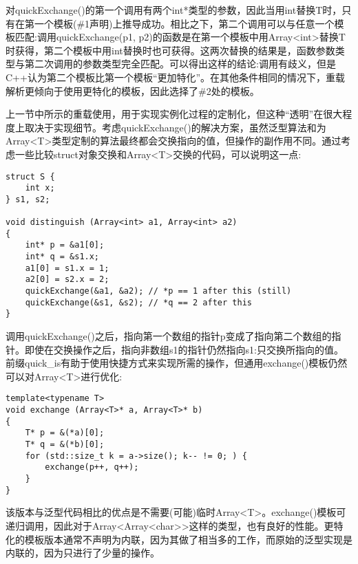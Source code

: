 对quickExchange()的第一个调用有两个int*类型的参数，因此当用int替换T时，只有在第一个模板(\#1声明)上推导成功。相比之下，第二个调用可以与任意一个模板匹配:调用quickExchange(p1, p2)的函数是在第一个模板中用Array<int>替换T时获得，第二个模板中用int替换时也可获得。这两次替换的结果是，函数参数类型与第二次调用的参数类型完全匹配。可以得出这样的结论:调用有歧义，但是C++认为第二个模板比第一个模板“更加特化”。在其他条件相同的情况下，重载解析更倾向于使用更特化的模板，因此选择了\#2处的模板。


上一节中所示的重载使用，用于实现实例化过程的定制化，但这种“透明”在很大程度上取决于实现细节。考虑quickExchange()的解决方案，虽然泛型算法和为Array<T>类型定制的算法最终都会交换指向的值，但操作的副作用不同。通过考虑一些比较struct对象交换和Array<T>交换的代码，可以说明这一点:

\begin{lstlisting}[style=styleCXX]
struct S {
	int x;
} s1, s2;

void distinguish (Array<int> a1, Array<int> a2)
{
	int* p = &a1[0];
	int* q = &s1.x;
	a1[0] = s1.x = 1;
	a2[0] = s2.x = 2;
	quickExchange(&a1, &a2); // *p == 1 after this (still)
	quickExchange(&s1, &s2); // *q == 2 after this
}
\end{lstlisting}

调用quickExchange()之后，指向第一个数组的指针p变成了指向第二个数组的指针。即使在交换操作之后，指向非数组s1的指针仍然指向s1:只交换所指向的值。前缀quick\_is有助于使用快捷方式来实现所需的操作，但通用exchange()模板仍然可以对Array<T>进行优化:

\begin{lstlisting}[style=styleCXX]
template<typename T>
void exchange (Array<T>* a, Array<T>* b)
{
	T* p = &(*a)[0];
	T* q = &(*b)[0];
	for (std::size_t k = a->size(); k-- != 0; ) {
		exchange(p++, q++);
	}
}
\end{lstlisting}

该版本与泛型代码相比的优点是不需要(可能)临时Array<T>。exchange()模板可递归调用，因此对于Array<Array<char>>这样的类型，也有良好的性能。更特化的模板版本通常不声明为内联，因为其做了相当多的工作，而原始的泛型实现是内联的，因为只进行了少量的操作。









